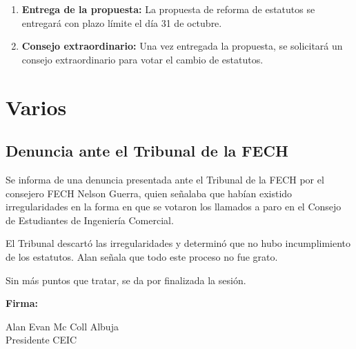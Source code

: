 \documentclass[12pt,letterpaper]{article}
\begin{document}
\begin{enumerate}
  \item \textbf{Entrega de la propuesta:} La propuesta de reforma de estatutos se entregará con plazo límite el día 31 de octubre.
  \item \textbf{Consejo extraordinario:} Una vez entregada la propuesta, se solicitará un consejo extraordinario para votar el cambio de estatutos.
\end{enumerate}

\section{Varios}

\subsection{Denuncia ante el Tribunal de la FECH}

Se informa de una denuncia presentada ante el Tribunal de la FECH por el consejero FECH Nelson Guerra, quien señalaba que habían existido irregularidades en la forma en que se votaron los llamados a paro en el Consejo de Estudiantes de Ingeniería Comercial.

El Tribunal descartó las irregularidades y determinó que no hubo incumplimiento de los estatutos. Alan señala que todo este proceso no fue grato.

\vspace{0.5em}

Sin más puntos que tratar, se da por finalizada la sesión.

\vspace{4em}

\noindent\textbf{Firma:}

\vspace{3em}

\noindent Alan Evan Mc Coll Albuja\\
Presidente CEIC
\end{document}
